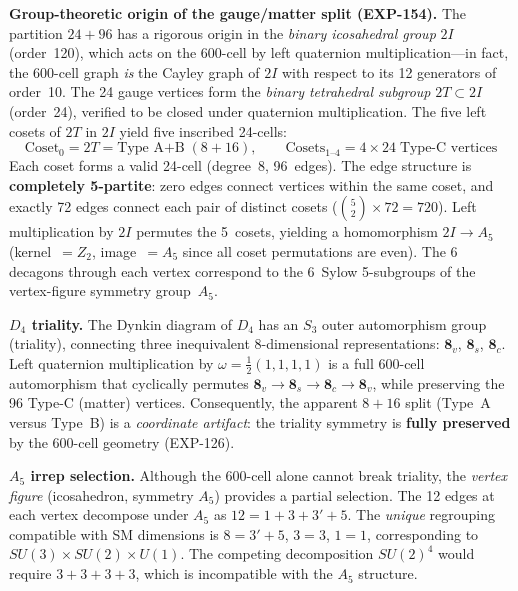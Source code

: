 \documentclass[12pt,a4paper]{article}
\begin{document}
\textbf{Group-theoretic origin of the gauge/matter split (EXP-154).} The partition $24 + 96$ has a rigorous origin in the \emph{binary icosahedral group} $2I$ (order~120), which acts on the 600-cell by left quaternion multiplication---in fact, the 600-cell graph \emph{is} the Cayley graph of $2I$ with respect to its 12 generators of order~10. The 24 gauge vertices form the \emph{binary tetrahedral subgroup} $2T \subset 2I$ (order~24), verified to be closed under quaternion multiplication. The five left cosets of $2T$ in $2I$ yield five inscribed 24-cells:
\begin{equation}
\text{Coset}_0 = 2T = \text{Type A+B} \;(8+16), \qquad \text{Cosets}_{1\text{--}4} = 4 \times 24 \;\text{Type-C vertices}
\end{equation}
Each coset forms a valid 24-cell (degree~8, 96~edges). The edge structure is \textbf{completely 5-partite}: zero edges connect vertices within the same coset, and exactly 72 edges connect each pair of distinct cosets ($\binom{5}{2} \times 72 = 720$). Left multiplication by $2I$ permutes the 5~cosets, yielding a homomorphism $2I \to A_5$ (kernel~$= Z_2$, image~$= A_5$ since all coset permutations are even). The 6 decagons through each vertex correspond to the 6~Sylow 5-subgroups of the vertex-figure symmetry group~$A_5$.

\textbf{$D_4$ triality.} The Dynkin diagram of $D_4$ has an $S_3$ outer automorphism group (triality), connecting three inequivalent 8-dimensional representations: $\mathbf{8}_v$, $\mathbf{8}_s$, $\mathbf{8}_c$. Left quaternion multiplication by $\omega = \tfrac{1}{2}(1,1,1,1)$ is a full 600-cell automorphism that cyclically permutes $\mathbf{8}_v \to \mathbf{8}_s \to \mathbf{8}_c \to \mathbf{8}_v$, while preserving the 96 Type-C (matter) vertices. Consequently, the apparent $8 + 16$ split (Type~A versus Type~B) is a \emph{coordinate artifact}: the triality symmetry is \textbf{fully preserved} by the 600-cell geometry (EXP-126).

\textbf{$A_5$ irrep selection.} Although the 600-cell alone cannot break triality, the \emph{vertex figure} (icosahedron, symmetry $A_5$) provides a partial selection. The 12 edges at each vertex decompose under $A_5$ as $12 = 1 + 3 + 3' + 5$. The \emph{unique} regrouping compatible with SM dimensions is $8 = 3' + 5$, $3 = 3$, $1 = 1$, corresponding to $SU(3) \times SU(2) \times U(1)$. The competing decomposition $SU(2)^4$ would require $3 + 3 + 3 + 3$, which is incompatible with the $A_5$ structure.
\end{document}
